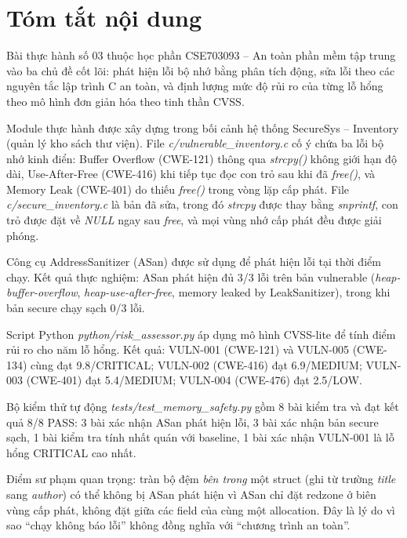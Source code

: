 
\section*{Tóm tắt nội dung}

Bài thực hành số 03 thuộc học phần CSE703093 -- An toàn phần mềm tập trung vào
ba chủ đề cốt lõi: phát hiện lỗi bộ nhớ bằng phân tích động, sửa lỗi theo các
nguyên tắc lập trình C an toàn, và định lượng mức độ rủi ro của từng lỗ hổng
theo mô hình đơn giản hóa theo tinh thần CVSS.

Module thực hành được xây dựng trong bối cảnh hệ thống SecureSys -- Inventory
(quản lý kho sách thư viện). File \textit{c/vulnerable\_inventory.c} cố ý chứa
ba lỗi bộ nhớ kinh điển: Buffer Overflow (CWE-121) thông qua
\textit{strcpy()} không giới hạn độ dài, Use-After-Free (CWE-416) khi
tiếp tục đọc con trỏ sau khi đã \textit{free()}, và Memory Leak
(CWE-401) do thiếu \textit{free()} trong vòng lặp cấp phát. File
\textit{c/secure\_inventory.c} là bản đã sửa, trong đó \textit{strcpy} được
thay bằng \textit{snprintf}, con trỏ được đặt về \textit{NULL} ngay sau
\textit{free}, và mọi vùng nhớ cấp phát đều được giải phóng.

Công cụ AddressSanitizer (ASan) được sử dụng để phát hiện lỗi tại thời
điểm chạy. Kết quả thực nghiệm: ASan phát hiện đủ 3/3 lỗi trên bản vulnerable
(\textit{heap-buffer-overflow}, \textit{heap-use-after-free}, memory leaked by
LeakSanitizer), trong khi bản secure chạy sạch 0/3 lỗi.

Script Python \textit{python/risk\_assessor.py} áp dụng mô hình CVSS-lite để
tính điểm rủi ro cho năm lỗ hổng. Kết quả: VULN-001 (CWE-121) và VULN-005
(CWE-134) cùng đạt 9.8/CRITICAL; VULN-002 (CWE-416) đạt 6.9/MEDIUM; VULN-003
(CWE-401) đạt 5.4/MEDIUM; VULN-004 (CWE-476) đạt 2.5/LOW.

Bộ kiểm thử tự động \textit{tests/test\_memory\_safety.py} gồm 8 bài kiểm tra
và đạt kết quả 8/8 PASS: 3 bài xác nhận ASan phát hiện lỗi, 3 bài xác nhận
bản secure sạch, 1 bài kiểm tra tính nhất quán với baseline, 1 bài xác nhận
VULN-001 là lỗ hổng CRITICAL cao nhất.

Điểm sư phạm quan trọng: tràn bộ đệm \emph{bên trong} một struct (ghi từ trường
\textit{title} sang \textit{author}) có thể không bị ASan phát hiện vì ASan chỉ
đặt redzone ở biên vùng cấp phát, không đặt giữa các field của cùng một
allocation. Đây là lý do vì sao ``chạy không báo lỗi'' không đồng nghĩa với
``chương trình an toàn''.

